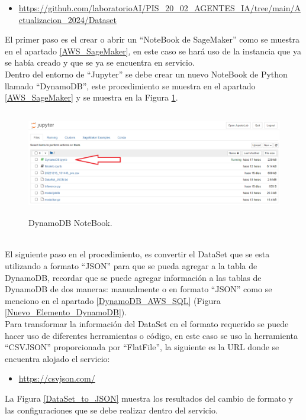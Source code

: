 \documentclass[a4paper,10pt, oneside, titlepage]{article}
\begin{document}
	\begin{itemize}
		\item \textcolor{blue}{\url{https://github.com/laboratorioAI/PIS_20_02_AGENTES_IA/tree/main/Actualizacion_2024/Dataset}}
	\end{itemize}
	\indent \indent El primer paso es el crear o abrir un ``NoteBook de SageMaker'' como se muestra en el apartado \ref{AWS_SageMaker}, en este caso se hará uso de la instancia que ya se había creado y que se ya se encuentra en servicio. \\\newline
	\indent Dentro del entorno de ``Jupyter'' se debe crear un nuevo NoteBook de Python llamado ``DynamoDB'', este procedimiento se muestra en el apartado \ref{AWS_SageMaker} y se muestra en la Figura \ref{DynamoDB_NoteBook}.
	\begin{figure}[!h]
		\centering
		\includegraphics[width = 1\linewidth, height = 4.6cm]{DynamoDB_NoteBook.png}
		\caption{DynamoDB NoteBook.}
		\label{DynamoDB_NoteBook}
	\end{figure} \\
	\indent El siguiente paso en el procedimiento, es convertir el DataSet que se esta utilizando a formato ``JSON'' para que se pueda agregar a la tabla de DynamoDB, recordar que se puede agregar información a las tablas de DynamoDB de dos maneras: manualmente o en formato ``JSON'' como se menciono en el apartado \ref{DynamoDB_AWS_SQL} (Figura \ref{Nuevo_Elemento_DynamoDB}). \\\newline
	\indent Para transformar la información del DataSet en el formato requerido se puede hacer uso de diferentes herramientas o código, en este caso se uso la herramienta ``CSVJSON'' proporcionada por ``FlatFile'', la siguiente es la URL donde se encuentra alojado el servicio:
	\begin{itemize}
		\item \textcolor{blue}{\url{https://csvjson.com/}}
	\end{itemize}
	\indent \indent La Figura \ref{DataSet_to_JSON} muestra los resultados del cambio de formato y las configuraciones que se debe realizar dentro del servicio.
\end{document}
